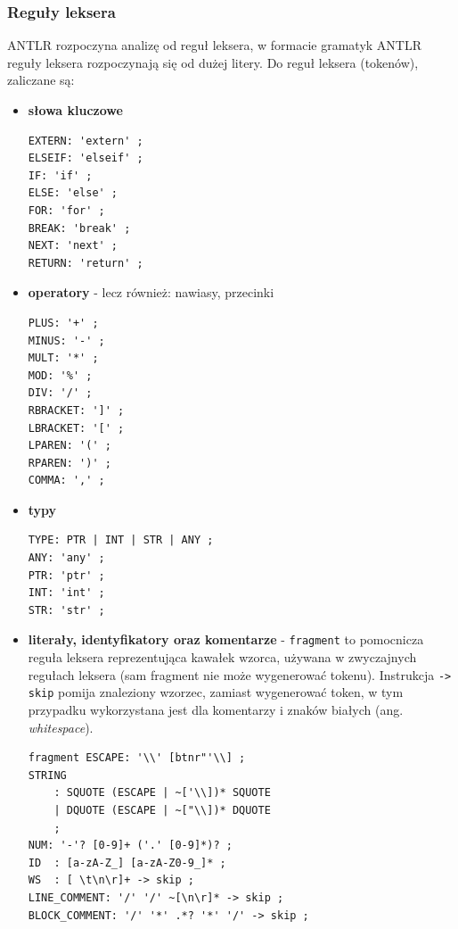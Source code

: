 \subsubsection{Reguły leksera}

ANTLR rozpoczyna analizę od reguł leksera, w formacie gramatyk ANTLR reguły leksera rozpoczynają się od dużej litery. Do reguł leksera (tokenów), zaliczane są:
\begin{itemize}
    \item \textbf{słowa kluczowe}
        \begin{lstlisting}[caption={Fragment listy słów kluczowych}]
EXTERN: 'extern' ;
ELSEIF: 'elseif' ;
IF: 'if' ;
ELSE: 'else' ;
FOR: 'for' ;
BREAK: 'break' ;
NEXT: 'next' ;
RETURN: 'return' ;
        \end{lstlisting}
    \newpage
    \item \textbf{operatory} - lecz również: nawiasy, przecinki
        \begin{lstlisting}[caption={Fragment listy operatorów i innych}]
PLUS: '+' ;
MINUS: '-' ;
MULT: '*' ;
MOD: '%' ;
DIV: '/' ;
RBRACKET: ']' ;
LBRACKET: '[' ;
LPAREN: '(' ;
RPAREN: ')' ;
COMMA: ',' ;
        \end{lstlisting}
    \item \textbf{typy}
        \begin{lstlisting}[caption={Lista typów}]
TYPE: PTR | INT | STR | ANY ;
ANY: 'any' ;
PTR: 'ptr' ;
INT: 'int' ;
STR: 'str' ;
        \end{lstlisting}
    \item \textbf{literały, identyfikatory oraz komentarze} - \verb|fragment| to pomocnicza reguła leksera reprezentująca kawałek wzorca, używana w zwyczajnych regułach leksera (sam fragment nie może wygenerować tokenu). Instrukcja \verb|-> skip| pomija znaleziony wzorzec, zamiast wygenerować token, w tym przypadku wykorzystana jest dla komentarzy i znaków białych (ang. \textit{whitespace}).
        \begin{lstlisting}[caption={Lista literałów, identyfikatorów oraz komentarzy}]
fragment ESCAPE: '\\' [btnr"'\\] ;
STRING
    : SQUOTE (ESCAPE | ~['\\])* SQUOTE
    | DQUOTE (ESCAPE | ~["\\])* DQUOTE
    ;
NUM: '-'? [0-9]+ ('.' [0-9]*)? ;
ID  : [a-zA-Z_] [a-zA-Z0-9_]* ;
WS  : [ \t\n\r]+ -> skip ;
LINE_COMMENT: '/' '/' ~[\n\r]* -> skip ;
BLOCK_COMMENT: '/' '*' .*? '*' '/' -> skip ;
        \end{lstlisting}
\end{itemize}

